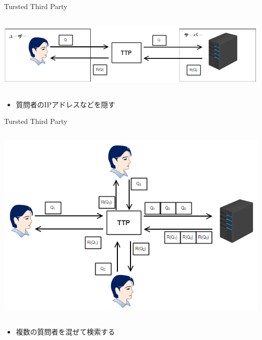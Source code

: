 \documentclass[14pt,xcolor=dvipsnames,table,dvipdfmx]{beamer}
\begin{document}
\begin{frame}{Tursted Third Party}
    \begin{columns}[t]
        \begin{column}{0.8\textwidth} %
            \includegraphics[width=\columnwidth]{photo9.png}
		\end{column}
    \end{columns}
	\begin{block}{} 
		\begin{itemize}
			\item 質問者のIPアドレスなどを隠す
		\end{itemize}
	\end{block}
\end{frame}
\begin{frame}{Tursted Third Party}
    \begin{columns}[t]
        \begin{column}{0.8\textwidth} %
            \includegraphics[width=\columnwidth]{photo9-1.png}
		\end{column}
    \end{columns}
	\begin{block}{} 
		\begin{itemize}
			\item 複数の質問者を混ぜて検索する
		\end{itemize}
	\end{block}
\end{frame}
\end{document}
